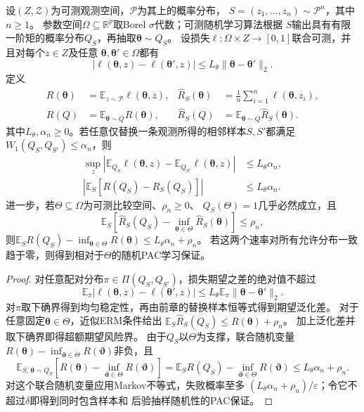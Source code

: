 \begin{theorem}[参数分布稳定性与期望泛化差]
\label{thm:distribution-stability-generalization}
设$(Z,\mathcal Z)$为可测观测空间，$\mathcal P$为其上的概率分布，
$S=(z_1,\ldots,z_n)\sim\mathcal P^n$，其中$n\geq1$。
参数空间$\Omega\subseteq\mathbb R^p$取Borel $\sigma$代数；可测随机学习算法根据
$S$输出具有有限一阶矩的概率分布$Q_S$，再抽取$\bm\theta\sim Q_S$。
设损失$\ell:\Omega\times Z\to[0,1]$联合可测，并且对每个$z\in Z$及任意
$\bm\theta,\bm\theta'\in\Omega$都有
\[
 |\ell(\bm\theta,z)-\ell(\bm\theta',z)|
 \leq L_\theta\|\bm\theta-\bm\theta'\|_2.
\]
定义
\[
 \begin{aligned}
 R(\bm\theta)&=\mathbb E_{z\sim\mathcal P}\ell(\bm\theta,z),&
 \hat R_S(\bm\theta)&=\frac1n\sum_{i=1}^n\ell(\bm\theta,z_i),\\
 R(Q)&=\mathbb E_{\bm\theta\sim Q}R(\bm\theta),&
 \hat R_S(Q)&=\mathbb E_{\bm\theta\sim Q}\hat R_S(\bm\theta).
 \end{aligned}
\]
其中$L_\theta,\alpha_n\geq0$。若任意仅替换一条观测所得的相邻样本$S,S'$都满足
$W_1(Q_S,Q_{S'})\leq\alpha_n$，则
\[
 \begin{aligned}
 \sup_z\left|\mathbb E_{Q_S}\ell(\bm\theta,z)
              -\mathbb E_{Q_{S'}}\ell(\bm\theta,z)\right|
 &\leq L_\theta\alpha_n,\\
 \left|\mathbb E_S[R(Q_S)-\hat R_S(Q_S)]\right|
 &\leq L_\theta\alpha_n.
 \end{aligned}
\]
进一步，若$\Theta\subseteq\Omega$为可测比较空间、$\rho_n\geq0$、
$Q_S(\Theta)=1$几乎必然成立，且
\[
 \mathbb E_S\left[\hat R_S(Q_S)-\inf_{\bm\theta\in\Theta}
                           \hat R_S(\bm\theta)\right]\leq\rho_n,
\]
则$\mathbb E_S R(Q_S)-\inf_{\bm\theta\in\Theta}R(\bm\theta)
\leq L_\theta\alpha_n+\rho_n$。
若这两个速率对所有允许分布一致趋于零，则得到相对于$\Theta$的随机PAC学习保证。
\end{theorem}
\begin{proof}
对任意配对分布$\pi\in\Pi(Q_S,Q_{S'})$，损失期望之差的绝对值不超过
\[
 \mathbb E_\pi|\ell(\bm\theta,z)-\ell(\bm\theta',z)|
 \leq L_\theta\mathbb E_\pi\|\bm\theta-\bm\theta'\|_2.
\]
对$\pi$取下确界得到均匀稳定性，再由前章的替换样本恒等式得到期望泛化差。
对于任意固定$\bm\theta\in\Theta$，近似ERM条件给出
$\mathbb E_S\hat R_S(Q_S)\leq R(\bm\theta)+\rho_n$。
加上泛化差并取下确界即得超额期望风险界。
由于$Q_S$以$\Theta$为支撑，联合随机变量
$R(\bm\theta)-\inf_{\bm\vartheta\in\Theta}R(\bm\vartheta)$非负，且
\[
 \mathbb E_{S,\,\bm\theta\sim Q_S}
 \left[R(\bm\theta)-\inf_{\bm\vartheta\in\Theta}R(\bm\vartheta)\right]
 =\mathbb E_S R(Q_S)-\inf_{\bm\vartheta\in\Theta}R(\bm\vartheta)
 \leq L_\theta\alpha_n+\rho_n.
\]
对这个联合随机变量应用Markov不等式，失败概率至多
$(L_\theta\alpha_n+\rho_n)/\varepsilon$；令它不超过$\delta$即得到同时包含样本和
后验抽样随机性的PAC保证。
\end{proof}

